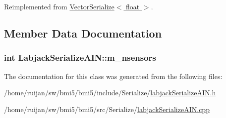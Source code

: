 Reimplemented from \hyperlink{classVectorSerialize_a929f94f68d0a99c61308520a679ae1a2}{Vector\-Serialize$<$ float $>$}.



\subsection{Member Data Documentation}
\hypertarget{classLabjackSerializeAIN_a85aea591bf54bc75577a2a090ce89369}{
\subsubsection[{m\-\_\-nsensors}]{\setlength{\rightskip}{0pt plus 5cm}int Labjack\-Serialize\-A\-I\-N\-::m\-\_\-nsensors}}\label{classLabjackSerializeAIN_a85aea591bf54bc75577a2a090ce89369}


The documentation for this class was generated from the following files\-:\begin{DoxyCompactItemize}
\item 
/home/ruijan/sw/bmi5/bmi5/include/\-Serialize/\hyperlink{labjackSerializeAIN_8h}{labjack\-Serialize\-A\-I\-N.\-h}\item 
/home/ruijan/sw/bmi5/bmi5/src/\-Serialize/\hyperlink{labjackSerializeAIN_8cpp}{labjack\-Serialize\-A\-I\-N.\-cpp}\end{DoxyCompactItemize}
